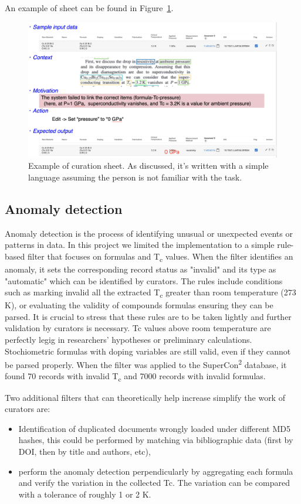 \documentclass[a4paper]{article}
\begin{document}
An example of sheet can be found in Figure~\ref{fig:example-curation-sheet}. 

\begin{figure}[ht]
  \centering
  \includegraphics[width=1\textwidth]{images/example-sheet-curation.png} 
  \caption{Example of curation sheet. As discussed, it's written with a simple language assuming the person is not familiar with the task. }
  \label{fig:example-curation-sheet}
\end{figure}

\subsection{Anomaly detection}
\label{subsec:anomaly-detection}
Anomaly detection is the process of identifying unusual or unexpected events or patterns in data. In this project we limited the implementation to a simple rule-based filter that focuses on formulas and T\textsubscript{c} values.
When the filter identifies an anomaly, it sets the corresponding record status as "invalid" and its type as "automatic" which can be identified by curators. 
The rules include conditions such as marking invalid all the extracted T\textsubscript{c} greater than room temperature (273 K), or evaluating the validity of compounds formulas ensuring they can be parsed. 
It is crucial to stress that these rules are to be taken lightly and further validation by curators is necessary. Tc values above room temperature are perfectly legig in researchers' hypotheses or preliminary calculations. Stochiometric formulas with doping variables are still valid, even if they cannot be parsed properly. 
When the filter was applied to the SuperCon\textsuperscript{2} database, it found 70 records with invalid T\textsubscript{c} and 7000 records with invalid formulas. 

Two additional filters that can theoretically help increase simplify the work of curators are: 
\begin{itemize}
    \item Identification of duplicated documents wrongly loaded under different MD5 hashes, this could be performed by matching via bibliographic data (first by DOI, then by title and authors, etc), 
    \item perform the anomaly detection perpendicularly by aggregating each formula and verify the variation in the collected Tc. The variation can be compared with a tolerance of roughly 1 or 2 K. 
\end{itemize}
\end{document}
